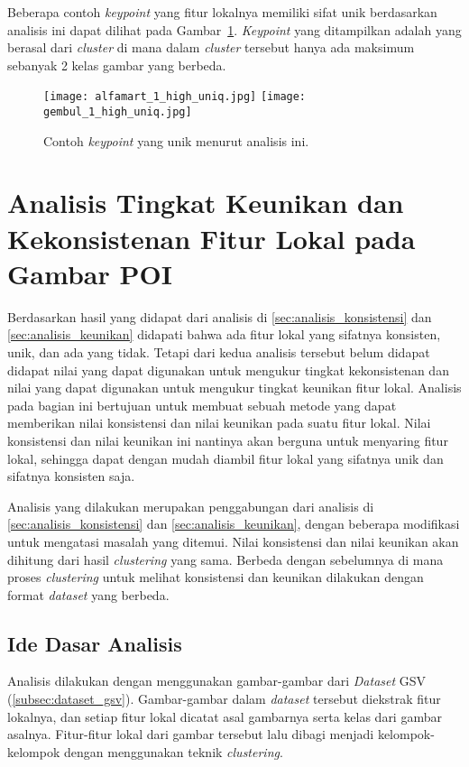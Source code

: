 Beberapa contoh \textit{keypoint} yang fitur lokalnya memiliki sifat unik berdasarkan analisis ini dapat dilihat pada Gambar~\ref{fig:keypoint_unik}. \textit{Keypoint} yang ditampilkan adalah yang berasal dari \textit{cluster} di mana dalam \textit{cluster} tersebut hanya ada maksimum sebanyak 2 kelas gambar yang berbeda.
\begin{figure}[H]
	\centering
	\texttt{[image: alfamart\_1\_high\_uniq.jpg]}
	\texttt{[image: gembul\_1\_high\_uniq.jpg]}
	\caption{Contoh \textit{keypoint} yang unik menurut analisis ini.}
	\label{fig:keypoint_unik}
\end{figure}

\section{Analisis Tingkat Keunikan dan Kekonsistenan Fitur Lokal pada Gambar POI}
\label{sec:analisis_sifat}
Berdasarkan hasil yang didapat dari analisis di \ref{sec:analisis_konsistensi} dan \ref{sec:analisis_keunikan} didapati bahwa ada fitur lokal yang sifatnya konsisten, unik, dan ada yang tidak. Tetapi dari kedua analisis tersebut belum didapat didapat nilai yang dapat digunakan untuk mengukur tingkat kekonsistenan dan nilai yang dapat digunakan untuk mengukur tingkat keunikan fitur lokal. Analisis pada bagian ini bertujuan untuk membuat sebuah metode yang dapat memberikan nilai konsistensi dan nilai keunikan pada suatu fitur lokal. Nilai konsistensi dan nilai keunikan ini nantinya akan berguna untuk menyaring fitur lokal, sehingga dapat dengan mudah diambil fitur lokal yang sifatnya unik dan sifatnya konsisten saja.

Analisis yang dilakukan merupakan penggabungan dari analisis di \ref{sec:analisis_konsistensi} dan \ref{sec:analisis_keunikan},  dengan beberapa modifikasi untuk mengatasi masalah yang ditemui. Nilai konsistensi dan nilai keunikan akan dihitung dari hasil \textit{clustering} yang sama. Berbeda dengan sebelumnya di mana proses \textit{clustering} untuk melihat konsistensi dan keunikan dilakukan dengan format \textit{dataset} yang berbeda. 

\subsection{Ide Dasar Analisis}
\label{subsec:ide_analisis_clustering}
Analisis dilakukan dengan menggunakan gambar-gambar dari \textit{Dataset} GSV (\ref{subsec:dataset_gsv}). Gambar-gambar dalam \textit{dataset} tersebut diekstrak fitur lokalnya, dan setiap fitur lokal dicatat asal gambarnya serta kelas dari gambar asalnya. Fitur-fitur lokal dari gambar tersebut lalu dibagi menjadi kelompok-kelompok dengan menggunakan teknik \textit{clustering}.

